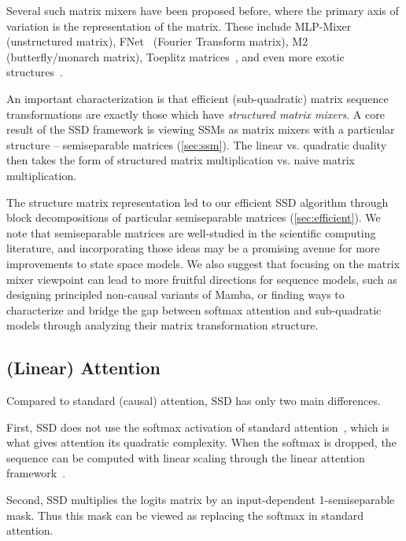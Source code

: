\documentclass{article}
\newcommand{\citep}{\parencite}
\begin{document}
Several such matrix mixers have been proposed before, where the primary axis of variation is the representation of the matrix.
These include MLP-Mixer~\citep{tolstikhin2021mlp} (unstructured matrix), FNet~\citep{lee2021fnet} (Fourier Transform matrix), M2~\citep{dao2019learning,dao2020kaleidoscope,dao2022monarch,fu2024monarch} (butterfly/monarch matrix),
Toeplitz matrices~\citep{poli2023hyena,qin2023toeplitz}, and even more exotic structures~\citep{de2018two,thomas2018learning}.

An important characterization is that efficient (sub-quadratic) matrix sequence transformations are exactly those which have \emph{structured matrix mixers}.
A core result of the SSD framework is viewing SSMs as matrix mixers with a particular structure -- semiseparable matrices (\cref{sec:ssm}).
The linear vs. quadratic duality then takes the form of structured matrix multiplication vs. naive matrix multiplication.

The structure matrix representation led to our efficient SSD algorithm through block decompositions of particular semiseparable matrices (\cref{sec:efficient}).
We note that semiseparable matrices are well-studied in the scientific computing literature, and incorporating those ideas may be a promising avenue for more improvements to state space models.
We also suggest that focusing on the matrix mixer viewpoint can lead to more fruitful directions for sequence models,
such as designing principled non-causal variants of Mamba, or finding ways to characterize and bridge the gap between softmax attention and sub-quadratic models through analyzing their matrix transformation structure.

\subsection{(Linear) Attention}
\label{sec:related:attention}

Compared to standard (causal) attention, SSD has only two main differences.

First, SSD does not use the softmax activation of standard attention~\citep{bahdanau2015neural,vaswani2017attention}, which is what gives attention its quadratic complexity.
When the softmax is dropped, the sequence can be computed with linear scaling through the linear attention framework~\citep{katharopoulos2020transformers}.

Second, SSD multiplies the logits matrix by an input-dependent 1-semiseparable mask.
Thus this mask can be viewed as replacing the softmax in standard attention.
\end{document}
